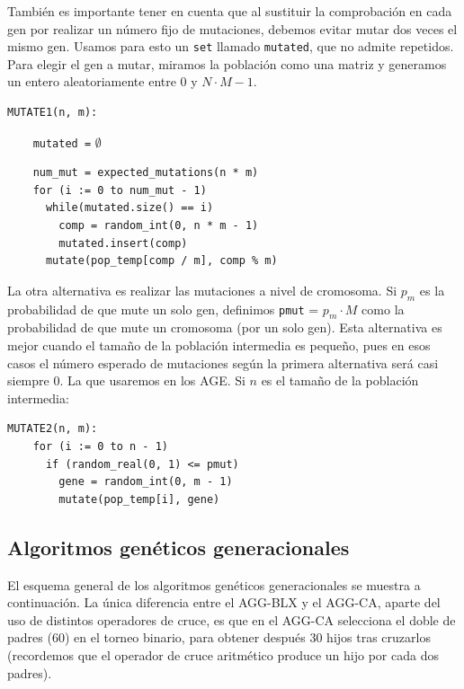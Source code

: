 \documentclass[12pt]{article}
\begin{document}
También es importante tener en cuenta que al sustituir la comprobación en cada gen por realizar un número fijo de mutaciones, debemos evitar mutar dos veces el mismo gen. Usamos para esto un \verb|set| llamado \verb|mutated|, que no admite repetidos. Para elegir el gen a mutar, miramos la población como una matriz y generamos un entero aleatoriamente entre $0$ y $N\cdot M - 1$.

\begin{verbatim}
MUTATE1(n, m):	
\end{verbatim} \vspace{-0.8em}\verb|    mutated =| $\emptyset$ \vspace{-0.5em}
\begin{verbatim}
    num_mut = expected_mutations(n * m)
    for (i := 0 to num_mut - 1) 
      while(mutated.size() == i) 
        comp = random_int(0, n * m - 1)
        mutated.insert(comp)
      mutate(pop_temp[comp / m], comp % m) 
\end{verbatim}

La otra alternativa es realizar las mutaciones a nivel de cromosoma. Si $p_m$ es la probabilidad de que mute un solo gen, definimos \verb|pmut| = $p_m \cdot M$ como la probabilidad de que mute un cromosoma (por un solo gen). Esta alternativa es mejor cuando el tamaño de la población intermedia es pequeño, pues en esos casos el número esperado de mutaciones según la primera alternativa será casi siempre $0$. La que usaremos en los AGE. Si $n$ es el tamaño de la población intermedia:

\begin{verbatim}
MUTATE2(n, m):
    for (i := 0 to n - 1)
      if (random_real(0, 1) <= pmut)
        gene = random_int(0, m - 1)
        mutate(pop_temp[i], gene)
\end{verbatim}

\subsection*{Algoritmos genéticos generacionales}
\label{agg}

El esquema general de los algoritmos genéticos generacionales se muestra a continuación. La única diferencia entre el AGG-BLX y el AGG-CA, aparte del uso de distintos operadores de cruce, es que en el AGG-CA selecciona el doble de padres (60) en el torneo binario, para obtener después 30 hijos tras cruzarlos (recordemos que el operador de cruce aritmético produce un hijo por cada dos padres).\\
\end{document}
